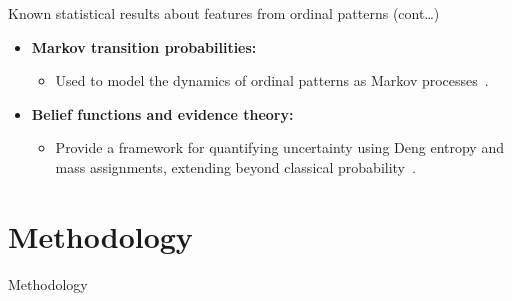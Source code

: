 \documentclass{beamer}
\begin{document}
\begin{frame}{Known statistical results about features from ordinal patterns (cont\dots)}
	\begin{itemize}
		\item \textbf{Markov transition probabilities:}
		\begin{itemize}
			\item Used to model the dynamics of ordinal patterns as Markov processes~\cite{Sakellariou2019}.
		\end{itemize}
		\item \textbf{Belief functions and evidence theory:}
		\begin{itemize}
			\item Provide a framework for quantifying uncertainty using Deng entropy and mass assignments, extending beyond classical probability~\cite{Xie2025}.
		\end{itemize}
	\end{itemize}
\end{frame}


\section{Methodology}

\begin{frame}
	\begin{center}
		\alert{Methodology}
	\end{center}
\end{frame}

\end{document}
